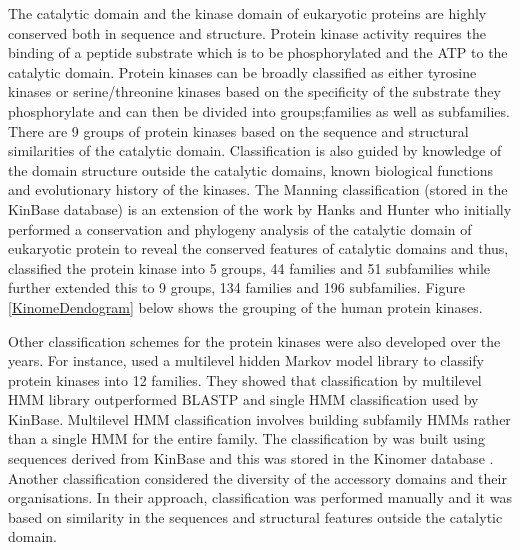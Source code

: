 \documentclass[a4paper, 11pt]{report}
\begin{document}
The catalytic domain and the kinase domain of eukaryotic proteins are highly conserved both in sequence and structure. Protein kinase activity requires the binding of a peptide substrate which is to be phosphorylated and the ATP to the catalytic domain. Protein kinases can be broadly classified as either tyrosine kinases or serine/threonine kinases based on the specificity of the substrate they phosphorylate and can then be divided into groups;families as well as subfamilies. There are 9 groups of protein kinases based on the sequence and structural similarities of the catalytic domain. Classification is also guided by knowledge of the domain structure outside the catalytic domains, known biological functions and evolutionary history of the kinases. The Manning classification (stored in the KinBase database) is an extension of the work by Hanks and Hunter who initially performed a conservation and phylogeny analysis of the catalytic domain of eukaryotic protein to reveal the conserved features of catalytic domains and thus, classified the protein kinase into 5 groups, 44 families and 51 subfamilies \cite{hanks1995protein} while \cite{manning2002protein} further extended this to 9 groups, 134 families and 196 subfamilies. Figure \ref{KinomeDendogram} below shows the grouping of the human protein kinases.\par
Other classification schemes for the protein kinases were also developed over the years. For instance, \cite{miranda2007classification} used a multilevel hidden Markov model library to classify protein kinases into 12 families. They showed that classification by multilevel HMM library outperformed BLASTP and single HMM classification used by KinBase. Multilevel HMM classification involves building subfamily HMMs rather than a single HMM for the entire family. The classification by \cite{miranda2007classification} was built using sequences derived from KinBase \cite{manning2002protein} and this was stored in the Kinomer database \cite{martin2008kinomer}. Another classification considered the diversity of the accessory domains and their organisations. In their approach, \cite{martin2010classification} classification was performed manually and it was based on similarity in the sequences and structural features outside the catalytic domain.
\end{document}
